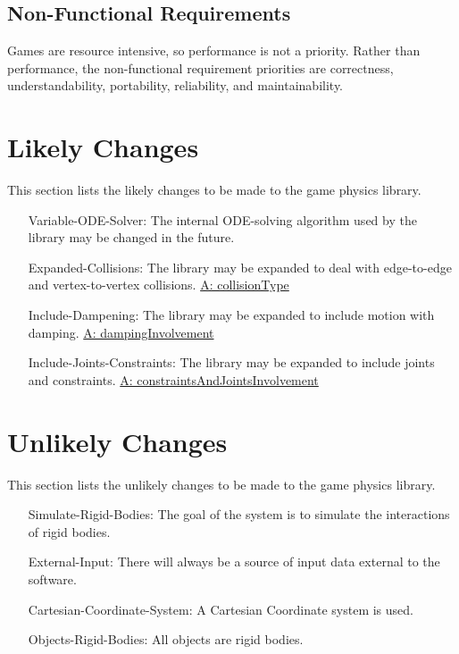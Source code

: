 \documentclass[12pt]{article}
\begin{document}
\subsection{Non-Functional Requirements}
\label{Sec:NFRs}
Games are resource intensive, so performance is not a priority.  Rather than performance, the non-functional requirement priorities are correctness, understandability, portability, reliability, and maintainability.
\section{Likely Changes}
\label{Sec:LCs}
This section lists the likely changes to be made to the game physics library.
\begin{itemize}
\item[Variable-ODE-Solver:\phantomsection\label{lcVODES}]The internal ODE-solving algorithm used by the library may be changed in the future.
\item[Expanded-Collisions:\phantomsection\label{lcEC}]The library may be expanded to deal with edge-to-edge and vertex-to-vertex collisions. \hyperref[assumpCT]{A: collisionType}
\item[Include-Dampening:\phantomsection\label{lcID}]The library may be expanded to include motion with damping. \hyperref[assumpDI]{A: dampingInvolvement}
\item[Include-Joints-Constraints:\phantomsection\label{lcIJC}]The library may be expanded to include joints and constraints. \hyperref[assumpCAJI]{A: constraintsAndJointsInvolvement}
\end{itemize}
\section{Unlikely Changes}
\label{Sec:UCs}
This section lists the unlikely changes to be made to the game physics library.
\begin{itemize}
\item[Simulate-Rigid-Bodies:\phantomsection\label{ucSRB}]The goal of the system is to simulate the interactions of rigid bodies.
\item[External-Input:\phantomsection\label{ucEI}]There will always be a source of input data external to the software.
\item[Cartesian-Coordinate-System:\phantomsection\label{ucCCS}]A Cartesian Coordinate system is used.
\item[Objects-Rigid-Bodies:\phantomsection\label{ucORB}]All objects are rigid bodies.
\end{itemize}
\end{document}
